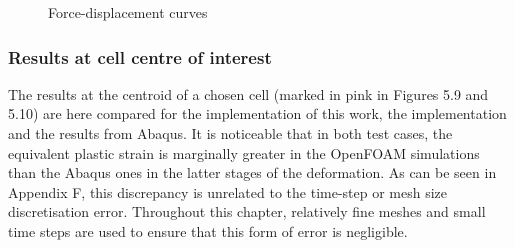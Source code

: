 \documentclass[sn-mathphys,Numbered,draft]{sn-jnl}%
\begin{document}
\begin{figure}[htbp]
	\centering
		
		
		\caption{Force-displacement curves}
	\label{label_for_entire_figure}
\end{figure}
\FloatBarrier



\subsubsection{Results at cell centre of interest}

The results at the centroid of a chosen cell (marked in pink in Figures 5.9 and 5.10) are here compared for the implementation of this work, the \citet{cardiff_lagrangian_2017} implementation and the results from Abaqus. It is noticeable that in both test cases, the equivalent plastic strain is marginally greater in the OpenFOAM simulations than the Abaqus ones in the latter stages of the deformation. As can be seen in Appendix F, this discrepancy is unrelated to the time-step or mesh size discretisation error. Throughout this chapter, relatively fine meshes and small time steps are used to ensure that this form of error is negligible.
\end{document}
